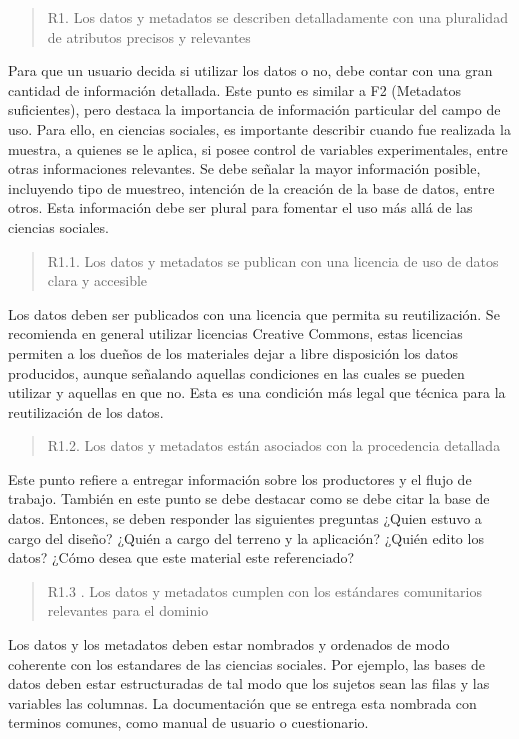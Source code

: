 \documentclass[
  14pt,
]{book}
\begin{document}
\begin{quote}
R1. Los datos y metadatos se describen detalladamente con una pluralidad de atributos precisos y relevantes
\end{quote}

Para que un usuario decida si utilizar los datos o no, debe contar con una gran cantidad de información detallada. Este punto es similar a F2 (Metadatos suficientes), pero destaca la importancia de información particular del campo de uso. Para ello, en ciencias sociales, es importante describir cuando fue realizada la muestra, a quienes se le aplica, si posee control de variables experimentales, entre otras informaciones relevantes. Se debe señalar la mayor información posible, incluyendo tipo de muestreo, intención de la creación de la base de datos, entre otros. Esta información debe ser plural para fomentar el uso más allá de las ciencias sociales.

\begin{quote}
R1.1. Los datos y metadatos se publican con una licencia de uso de datos clara y accesible
\end{quote}

Los datos deben ser publicados con una licencia que permita su reutilización. Se recomienda en general utilizar licencias Creative Commons, estas licencias permiten a los dueños de los materiales dejar a libre disposición los datos producidos, aunque señalando aquellas condiciones en las cuales se pueden utilizar y aquellas en que no. Esta es una condición más legal que técnica para la reutilización de los datos.

\begin{quote}
R1.2. Los datos y metadatos están asociados con la procedencia detallada
\end{quote}

Este punto refiere a entregar información sobre los productores y el flujo de trabajo. También en este punto se debe destacar como se debe citar la base de datos. Entonces, se deben responder las siguientes preguntas ¿Quien estuvo a cargo del diseño? ¿Quién a cargo del terreno y la aplicación? ¿Quién edito los datos? ¿Cómo desea que este material este referenciado?

\begin{quote}
R1.3 . Los datos y metadatos cumplen con los estándares comunitarios relevantes para el dominio
\end{quote}

Los datos y los metadatos deben estar nombrados y ordenados de modo coherente con los estandares de las ciencias sociales. Por ejemplo, las bases de datos deben estar estructuradas de tal modo que los sujetos sean las filas y las variables las columnas. La documentación que se entrega esta nombrada con terminos comunes, como manual de usuario o cuestionario.
\end{document}
